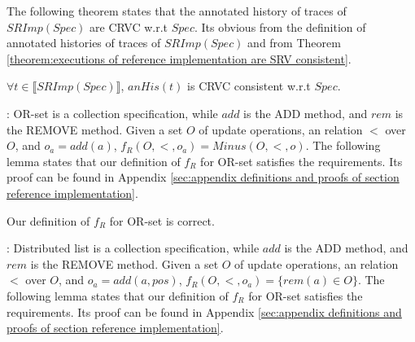


The following theorem states that the annotated history of traces of $SRImp(Spec)$ are CRVC w.r.t $Spec$. Its obvious from the definition of annotated histories of traces of $SRImp(Spec)$ and from Theorem \ref{theorem:executions of reference implementation are SRV consistent}.

\begin{lemma}
\label{lemma:the abstract trace of CRIMPSpec is a subset of the abstract trace of RIMPSpec}
$\forall t \in \llbracket SRImp(Spec) \rrbracket$, $anHis(t)$ is CRVC consistent w.r.t $Spec$.
\end{lemma}


: OR-set is a collection specification, while $add$ is the ADD method, and $rem$ is the REMOVE method. Given a set $O$ of update operations, an relation $<$ over $O$, and $o_a = add(a)$, $f_R(O,<,o_a) = Minus(O,<,o)$. The following lemma states that our definition of $f_R$ for OR-set satisfies the requirements. Its proof can be found in Appendix \ref{sec:appendix definitions and proofs of section reference implementation}.

\begin{lemma}
\label{lemma:Minus for OR-set is correct}
Our definition of $f_R$ for OR-set is correct.
\end{lemma}

: Distributed list is a collection specification, while $add$ is the ADD method, and $rem$ is the REMOVE method. Given a set $O$ of update operations, an relation $<$ over $O$, and $o_a = add(a,pos)$, $f_R(O,<,o_a) = \{ rem(a) \in O \}$. The following lemma states that our definition of $f_R$ for OR-set satisfies the requirements. Its proof can be found in Appendix \ref{sec:appendix definitions and proofs of section reference implementation}.

